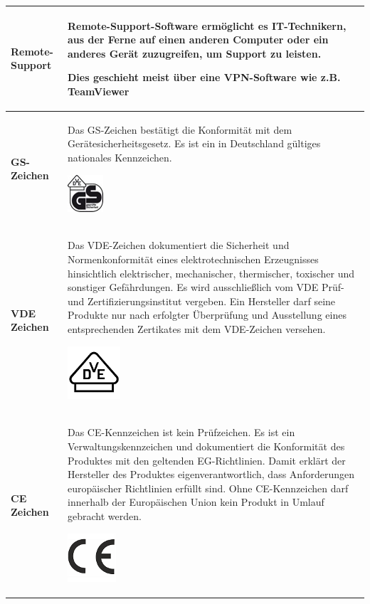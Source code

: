 \documentclass[10pt]{article}
\begin{document}
\begin{flushleft}
\begin{longtable}{|p{}|p{}|}
        \textbf{Remote-Support}&
        Remote-Support-Software ermöglicht es IT-Technikern, aus der Ferne auf einen anderen Computer oder ein anderes Gerät zuzugreifen, um Support zu leisten.

        Dies geschieht meist über eine VPN-Software wie z.B. TeamViewer
        \\\hline
        
        \textbf{GS-Zeichen}&
        Das GS-Zeichen bestätigt die Konformität mit dem Gerätesicherheitsgesetz. Es ist ein in Deutschland gültiges nationales Kennzeichen.
        
        \includegraphics{gs.jpg}
        \\\hline

        \textbf{VDE Zeichen}&
        Das VDE-Zeichen dokumentiert die Sicherheit und Normenkonformität eines elektrotechnischen Erzeugnisses hinsichtlich elektrischer, mechanischer, thermischer, toxischer und sonstiger Gefährdungen. Es wird ausschließlich vom VDE Prüf- und Zertifizierungsinstitut vergeben. Ein Hersteller darf seine Produkte nur nach erfolgter Überprüfung und Ausstellung eines entsprechenden Zertikates mit dem VDE-Zeichen versehen.
        
        \includegraphics{vde.png}
        \\\hline
        
        \textbf{CE Zeichen}&
        Das CE-Kennzeichen ist kein Prüfzeichen. Es ist ein Verwaltungskennzeichen und dokumentiert die Konformität des Produktes mit den geltenden EG-Richtlinien. Damit erklärt der Hersteller des Produktes eigenverantwortlich, dass Anforderungen europäischer Richtlinien erfüllt sind. Ohne CE-Kennzeichen darf innerhalb der Europäischen Union kein Produkt in Umlauf gebracht werden.
        
        \includegraphics{ce.png}
        \\\hline


\end{longtable}
\end{flushleft}
\end{document}
